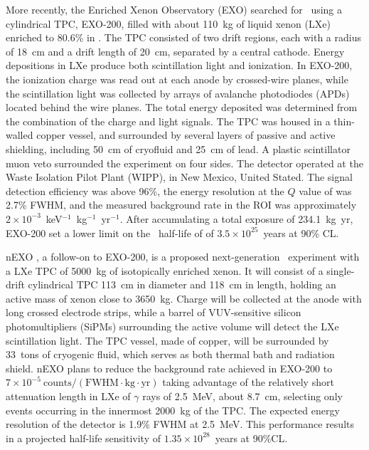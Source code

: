 More recently, the Enriched Xenon Observatory (EXO) searched for \bbonu\ using a cylindrical TPC, EXO-200, filled with about 110~kg of liquid xenon (LXe) enriched to 80.6\% in  \cite{EXO-200:2019rkq}. The TPC consisted of two drift regions, each with a radius of 18~cm and a drift length of 20~cm, separated by a central cathode. Energy depositions in LXe produce both scintillation light and ionization. In EXO-200, the ionization charge was read out at each anode by crossed-wire planes, while the scintillation light was collected by arrays of avalanche photodiodes (APDs) located behind the wire planes. The total energy deposited was determined from the combination of the charge and light signals. The TPC was housed in a thin-walled copper vessel, and surrounded by several layers of passive and active shielding, including 50~cm of cryofluid and 25~cm of lead. A plastic scintillator muon veto surrounded the experiment on four sides. The detector operated at the Waste Isolation Pilot Plant (WIPP), in New Mexico, United Stated. The signal detection efficiency was above 96\%, the energy resolution at the $Q$ value of  was 2.7\% FWHM, and the measured background rate in the ROI was approximately $2\times10^{-3}$~keV$^{-1}$~kg$^{-1}$~yr$^{-1}$. After accumulating a total exposure of 234.1~kg~yr, EXO-200 set a lower limit on the \bbonu\ half-life of  of $3.5\times10^{25}$~years at 90\% CL.

nEXO \cite{nEXO:2018ylp,nEXO:2021ujk}, a follow-on to EXO-200, is a proposed next-generation \bbonu\ experiment with a LXe TPC of 5000~kg of isotopically enriched xenon. It will consist of a single-drift cylindrical TPC 113~cm in diameter and 118~cm in length, holding an active mass of xenon close to 3650~kg. Charge will be collected at the anode with long crossed electrode strips, while a barrel of VUV-sensitive silicon photomultipliers (SiPMs) surrounding the active volume will detect the LXe scintillation light. The TPC vessel, made of copper, will be surrounded by 33~tons of cryogenic fluid, which serves as both thermal bath and radiation shield. nEXO plans to reduce the background rate achieved in EXO-200 to $7\times10^{-5}~\mathrm{counts/(FWHM\cdot kg\cdot yr)}$ taking advantage of the relatively short attenuation length in LXe of $\gamma$ rays of 2.5~MeV, about 8.7~cm, selecting only events occurring in the innermost 2000~kg of the TPC. The expected energy resolution of the detector is 1.9\% FWHM at 2.5~MeV. This performance results in a projected half-life sensitivity of $1.35\times10^{28}$~years at 90\%CL.
  
